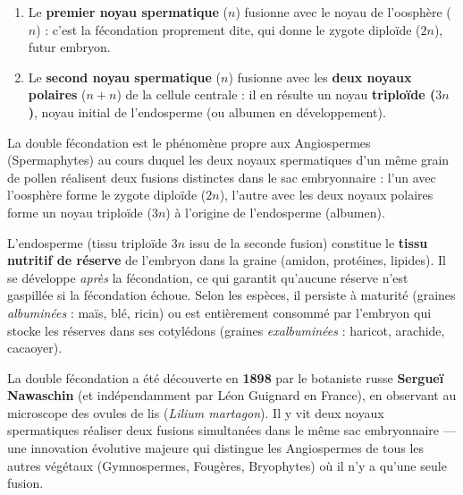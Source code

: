 \documentclass[11pt]{article}
\newcommand{\cle}[1]{{\popxbold\color{popdark}#1}}
\begin{document}
\begin{enumerate}
\item Le \textbf{premier noyau spermatique} ($n$) fusionne avec le noyau de l'\cle{oosphère} ($n$) : c'est la fécondation proprement dite, qui donne le \cle{zygote} diploïde ($2n$), futur embryon.
\item Le \textbf{second noyau spermatique} ($n$) fusionne avec les \textbf{deux noyaux polaires} ($n + n$) de la \cle{cellule centrale} : il en résulte un noyau \textbf{triploïde ($3n$)}, noyau initial de l'\cle{endosperme} (ou albumen en développement).
\end{enumerate}

\begin{definition}
La \cle{double fécondation} est le phénomène propre aux Angiospermes (Spermaphytes) au cours duquel les deux noyaux spermatiques d'un même grain de pollen réalisent deux fusions distinctes dans le sac embryonnaire : l'un avec l'oosphère forme le zygote diploïde ($2n$), l'autre avec les deux noyaux polaires forme un noyau triploïde ($3n$) à l'origine de l'endosperme (albumen).
\end{definition}

\begin{propriete}
L'\cle{endosperme} (tissu triploïde $3n$ issu de la seconde fusion) constitue le \textbf{tissu nutritif de réserve} de l'embryon dans la graine (amidon, protéines, lipides). Il se développe \emph{après} la fécondation, ce qui garantit qu'aucune réserve n'est gaspillée si la fécondation échoue. Selon les espèces, il persiste à maturité (graines \emph{albuminées} : maïs, blé, ricin) ou est entièrement consommé par l'embryon qui stocke les réserves dans ses cotylédons (graines \emph{exalbuminées} : haricot, arachide, cacaoyer).
\end{propriete}

\begin{savaistu}
La double fécondation a été découverte en \textbf{1898} par le botaniste russe \textbf{Sergueï Nawaschin} (et indépendamment par Léon Guignard en France), en observant au microscope des ovules de lis (\emph{Lilium martagon}). Il y vit deux noyaux spermatiques réaliser deux fusions simultanées dans le même sac embryonnaire — une innovation évolutive majeure qui distingue les Angiospermes de tous les autres végétaux (Gymnospermes, Fougères, Bryophytes) où il n'y a qu'une seule fusion.
\end{savaistu}
\end{document}
